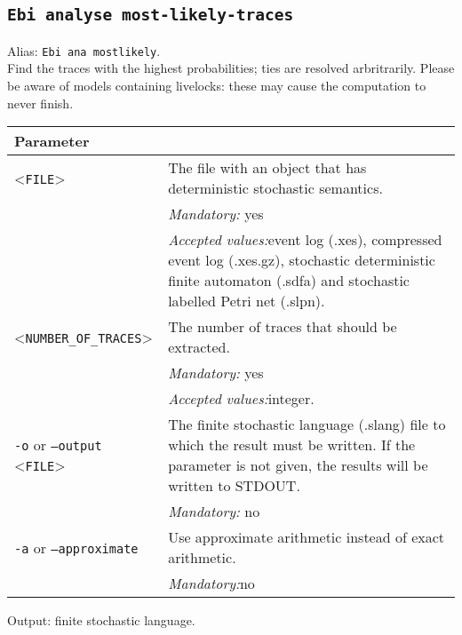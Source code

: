 {\subsection{\texttt{Ebi analyse most-likely-traces}}
Alias: \texttt{Ebi ana mostlikely}.\\
Find the traces with the highest probabilities; ties are resolved arbritrarily.
Please be aware of models containing livelocks: these may cause the computation to never finish.\\
\begin{tabularx}{\linewidth}{lX}
\toprule
Parameter \\\midrule
<\texttt{FILE}>&The file with an object that has deterministic stochastic semantics.\\
&\textit{Mandatory:} \quad yes\\
&\textit{Accepted values:}\quad event log (.xes), compressed event log (.xes.gz), stochastic deterministic finite automaton (.sdfa) and stochastic labelled Petri net (.slpn).\\
<\texttt{NUMBER\_OF\_TRACES}>&The number of traces that should be extracted.\\
&\textit{Mandatory:} \quad yes\\
&\textit{Accepted values:}\quad integer.\\
\texttt{-o} or \texttt{--output} <\texttt{FILE}> &
The finite stochastic language (.slang) file to which the result must be written. If the parameter is not given, the results will be written to STDOUT.\\
&\textit{Mandatory:} \quad no\\
\texttt{-a} or \texttt{--approximate} & Use approximate arithmetic instead of exact arithmetic.\\
&\textit{Mandatory:}\quad no\\
\bottomrule
\end{tabularx}
Output: finite stochastic language.
}
